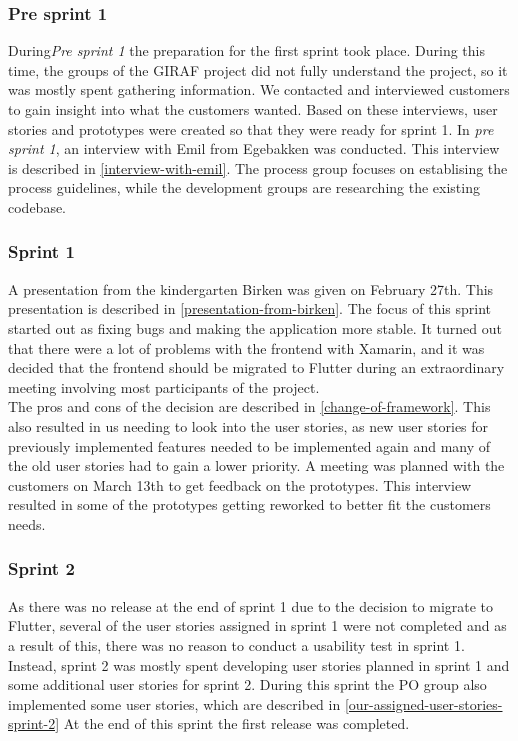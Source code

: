 \subsubsection{Pre sprint 1}
During\textit{Pre sprint 1} the preparation for the first sprint took place.
During this time, the groups of the GIRAF project did not fully understand the project, so it was mostly spent gathering information.
We contacted and interviewed customers to gain insight into what the customers wanted.
Based on these interviews, user stories and prototypes were created so that they were ready for sprint 1.
In \textit{pre sprint 1}, an interview with Emil from Egebakken was conducted. 
This interview is described in \autoref{interview-with-emil}.
The process group focuses on establising the process guidelines, while the development groups are researching the existing codebase.

\subsubsection{Sprint 1}
A presentation from the kindergarten Birken was given on February 27th.
This presentation is described in \autoref{presentation-from-birken}.
The focus of this sprint started out as fixing bugs and making the application more stable.
It turned out that there were a lot of problems with the frontend with Xamarin, and it was decided that the frontend should be migrated to Flutter during an extraordinary meeting involving most participants of the project. \\
The pros and cons of the decision are described in \autoref{change-of-framework}.
This also resulted in us needing to look into the user stories, as new user stories for previously implemented features needed to be implemented again and many of the old user stories had to gain a lower priority.
A meeting was planned with the customers on March 13th to get feedback on the prototypes. 
This interview resulted in some of the prototypes getting reworked to better fit the customers needs.

\subsubsection{Sprint 2}
As there was no release at the end of sprint 1 due to the decision to migrate to Flutter, several of the user stories assigned in sprint 1 were not completed and as a result of this, there was no reason to conduct a usability test in sprint 1.
Instead, sprint 2 was mostly spent developing user stories planned in sprint 1 and some additional user stories for sprint 2.
During this sprint the PO group also implemented some user stories, which are described in \autoref{our-assigned-user-stories-sprint-2}
At the end of this sprint the first release was completed.

